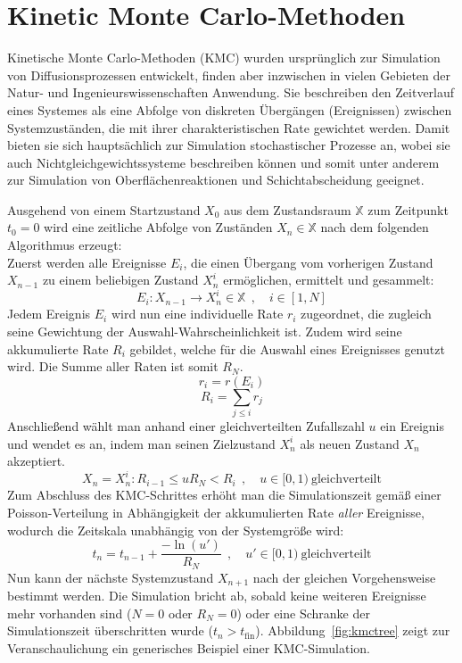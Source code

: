 \section{Kinetic Monte Carlo-Methoden}
\label{kmc}

Kinetische Monte Carlo-Methoden (KMC) wurden ursprünglich zur Simulation von Diffusionsprozessen entwickelt, finden aber inzwischen in vielen Gebieten der Natur- und Ingenieurswissenschaften Anwendung.
Sie beschreiben den Zeitverlauf eines Systemes als eine Abfolge von diskreten Übergängen (Ereignissen) zwischen Systemzuständen, die mit ihrer charakteristischen Rate gewichtet werden.
Damit bieten sie sich hauptsächlich zur Simulation stochastischer Prozesse an, wobei sie auch Nichtgleichgewichtssysteme beschreiben können und somit unter anderem zur Simulation von Oberflächenreaktionen und Schichtabscheidung geeignet.

Ausgehend von einem Startzustand $X_0$ aus dem Zustandsraum $\mathbb{X}$ zum Zeitpunkt $t_0 = 0$ wird eine zeitliche Abfolge von Zuständen $X_n \in \mathbb{X}$ nach dem folgenden Algorithmus erzeugt:\\
Zuerst werden alle Ereignisse $E_i$, die einen Übergang vom vorherigen Zustand $X_{n-1}$ zu einem beliebigen Zustand $X_n^i$ ermöglichen, ermittelt und gesammelt:
\begin{equation}
  E_i : X_{n-1} \rightarrow X_n^i \in \mathbb{X} ~~,\quad i \in [1, N]
\end{equation}
Jedem Ereignis $E_i$ wird nun eine individuelle Rate $r_i$ zugeordnet, die zugleich seine Gewichtung der Auswahl-Wahrscheinlichkeit ist.
Zudem wird seine akkumulierte Rate $R_i$ gebildet, welche für die Auswahl eines Ereignisses genutzt wird.
Die Summe aller Raten ist somit $R_N$.
\begin{equation}
  r_i = r(E_i)
\end{equation}
\begin{equation}
  R_i = \sum_{j \le i}{r_j}
\end{equation}
Anschließend wählt man anhand einer gleichverteilten Zufallszahl $u$ ein Ereignis und wendet es an, indem man seinen Zielzustand $X_n^i$ als neuen Zustand $X_n$ akzeptiert.
\begin{equation}
  X_n = X_n^i : R_{i-1} \le u R_N < R_i ~~,\quad u \in [0,1)~\text{gleichverteilt}
\end{equation}
Zum Abschluss des KMC-Schrittes erhöht man die Simulationszeit gemäß einer Poisson-Verteilung in Abhängigkeit der akkumulierten Rate \textit{aller} Ereignisse, wodurch die Zeitskala unabhängig von der Systemgröße wird:
\begin{equation}
  t_n = t_{n-1} + \frac{-\ln(u')}{R_N} ~~,\quad u' \in [0,1)~\text{gleichverteilt}
\end{equation}
Nun kann der nächste Systemzustand $X_{n+1}$ nach der gleichen Vorgehensweise bestimmt werden.
Die Simulation bricht ab, sobald keine weiteren Ereignisse mehr vorhanden sind ($N=0$ oder $R_N=0$) oder eine Schranke der Simulationszeit überschritten wurde ($t_n > t_\text{fin}$).
Abbildung~\ref{fig:kmctree} zeigt zur Veranschaulichung ein generisches Beispiel einer KMC-Simulation.

